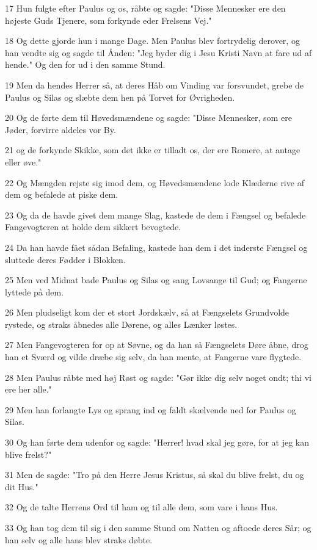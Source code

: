 \par 17 Hun fulgte efter Paulus og os, råbte og sagde: "Disse Mennesker ere den højeste Guds Tjenere, som forkynde eder Frelsens Vej."
\par 18 Og dette gjorde hun i mange Dage. Men Paulus blev fortrydelig derover, og han vendte sig og sagde til Ånden: "Jeg byder dig i Jesu Kristi Navn at fare ud af hende." Og den for ud i den samme Stund.
\par 19 Men da hendes Herrer så, at deres Håb om Vinding var forsvundet, grebe de Paulus og Silas og slæbte dem hen på Torvet for Øvrigheden.
\par 20 Og de førte dem til Høvedsmændene og sagde: "Disse Mennesker, som ere Jøder, forvirre aldeles vor By.
\par 21 og de forkynde Skikke, som det ikke er tilladt os, der ere Romere, at antage eller øve."
\par 22 Og Mængden rejste sig imod dem, og Høvedsmændene lode Klæderne rive af dem og befalede at piske dem.
\par 23 Og da de havde givet dem mange Slag, kastede de dem i Fængsel og befalede Fangevogteren at holde dem sikkert bevogtede.
\par 24 Da han havde fået sådan Befaling, kastede han dem i det inderste Fængsel og sluttede deres Fødder i Blokken.
\par 25 Men ved Midnat bade Paulus og Silas og sang Lovsange til Gud; og Fangerne lyttede på dem.
\par 26 Men pludseligt kom der et stort Jordskælv, så at Fængselets Grundvolde rystede, og straks åbnedes alle Dørene, og alles Lænker løstes.
\par 27 Men Fangevogteren for op at Søvne, og da han så Fængselets Døre åbne, drog han et Sværd og vilde dræbe sig selv, da han mente, at Fangerne vare flygtede.
\par 28 Men Paulus råbte med høj Røst og sagde: "Gør ikke dig selv noget ondt; thi vi ere her alle."
\par 29 Men han forlangte Lys og sprang ind og faldt skælvende ned for Paulus og Silas.
\par 30 Og han førte dem udenfor og sagde: "Herrer! hvad skal jeg gøre, for at jeg kan blive frelst?"
\par 31 Men de sagde: "Tro på den Herre Jesus Kristus, så skal du blive frelst, du og dit Hus."
\par 32 Og de talte Herrens Ord til ham og til alle dem, som vare i hans Hus.
\par 33 Og han tog dem til sig i den samme Stund om Natten og aftoede deres Sår; og han selv og alle hans blev straks døbte.
